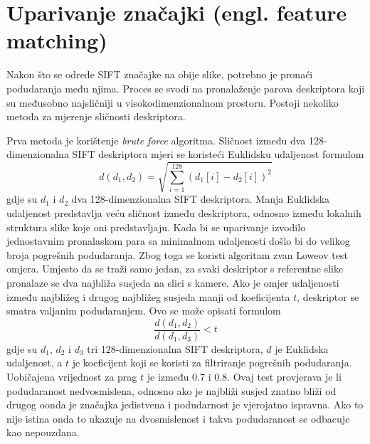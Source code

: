 \section{Uparivanje značajki (engl. feature matching)}

Nakon što se odrede SIFT značajke na obije slike, potrebno je pronaći podudaranja među njima. Proces se svodi na pronalaženje parova deskriptora koji su međusobno najsličniji u visokodimenzionalnom prostoru. Postoji nekoliko metoda za mjerenje sličnosti deskriptora.

Prva metoda je korištenje \textit{brute force} algoritma. Sličnost između dva 128-dimenzionalna SIFT deskriptora mjeri se koristeći Euklidsku udaljenost formulom
\begin{equation}
    d(d_1, d_2) = \sqrt{\sum_{i=1}^{128} (d_1[i] - d_2[i])^2}
\end{equation}
gdje su $d_1$ i $d_2$ dva 128-dimenzionalna SIFT deskriptora. Manja Euklidska udaljenost predstavlja veću sličnost između deskriptora, odnosno između lokalnih struktura slike koje oni predstavljaju.
Kada bi se uparivanje izvodilo jednostavnim pronalaskom para sa minimalnom udaljenosti došlo bi do velikog broja pogrešnih podudaranja. Zbog toga se koristi algoritam zvan Loweov test omjera. Umjesto da se traži samo jedan, za svaki deskriptor s referentne slike pronalaze se dva najbliža susjeda na slici s kamere. Ako je omjer udaljenosti između najbližeg i drugog najbližeg susjeda manji od koeficijenta $t$, deskriptor se smatra valjanim podudaranjem. Ovo se može opisati formulom
\begin{equation}
    \frac{d(d_1, d_2)}{d(d_1, d_3)} < t
\end{equation}
gdje su $d_1$, $d_2$ i $d_3$ tri 128-dimenzionalna SIFT deskriptora, $d$ je Euklidska udaljenost, a $t$ je koeficijent koji se koristi za filtriranje pogrešnih podudaranja. Uobičajena vrijednost za prag $t$ je između 0.7 i 0.8. Ovaj test provjerava je li podudaranost nedvosmislena, odnosno ako je najbliži susjed znatno bliži od drugog oonda je značajka jedistvena i podudarnost je vjerojatno ispravna. Ako to nije istina onda to ukazuje na dvosmislenost i takva podudaranost se odbacuje kao nepouzdana.

